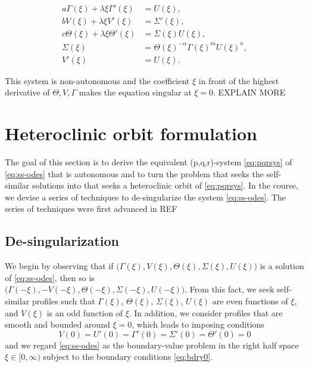 \documentclass[a4paper,11pt]{article}
\begin{document}
\begin{equation}
\begin{aligned}
 a \Gamma(\xi) + \lambda \xi \Gamma'(\xi) &= U(\xi),\\
 b V(\xi) + \lambda \xi V'(\xi) &= \Sigma'(\xi),\\
 c \Theta(\xi) + \lambda \xi \Theta'(\xi)&=\Sigma(\xi) U(\xi),\\
 \Sigma(\xi) &= \Theta(\xi)^{-\alpha} \Gamma(\xi)^m U(\xi)^n,\\
 V'(\xi)&=U(\xi).
\end{aligned} \label{eq:ss-odes}
\end{equation}

This system is non-autonomous and the coefficient $\xi$ in front of the highest derivative of $\Theta, V, \Gamma$ makes the equation singular at $\xi=0$. EXPLAIN MORE

\section{Heteroclinic orbit formulation}
The goal of this section is to derive the equivalent (p,q,r)-system \eqref{eq:pqrsys} of \eqref{eq:ss-odes} that is autonomous and to turn the problem that seeks the self-similar solutions into that seeks a heteroclinic orbit of \eqref{eq:pqrsys}. In the course, we devise a series of techniques to de-singularize the system \eqref{eq:ss-odes}. The series of techniques were first advanced in REF

\subsection{De-singularization}
We begin by observing that if $\big(\Gamma(\xi), V(\xi), \Theta(\xi), \Sigma(\xi), U(\xi)\big)$ is a solution of \eqref{eq:ss-odes}, then so is \\$\big(\Gamma(-\xi), -V(-\xi), \Theta(-\xi), \Sigma(-\xi), U(-\xi)\big)$. From this fact, we seek self-similar profiles such that $\Gamma(\xi)$, $\Theta(\xi)$, $\Sigma(\xi)$, $U(\xi)$ are even functions of $\xi$, and $V(\xi)$ is an odd function of $\xi$. In addition, we consider profiles that are smooth and bounded around $\xi=0$, which leads to imposing conditions
\begin{equation}
 V(0)=U'(0)=\Gamma'(0)=\Sigma'(0)=\Theta'(0)=0 \label{eq:bdry0}
\end{equation}
and we regard \eqref{eq:ss-odes} as the boundary-value problem in the right half space $\xi \in [0,\infty)$ subject to the boundary conditions \eqref{eq:bdry0}.
\end{document}
